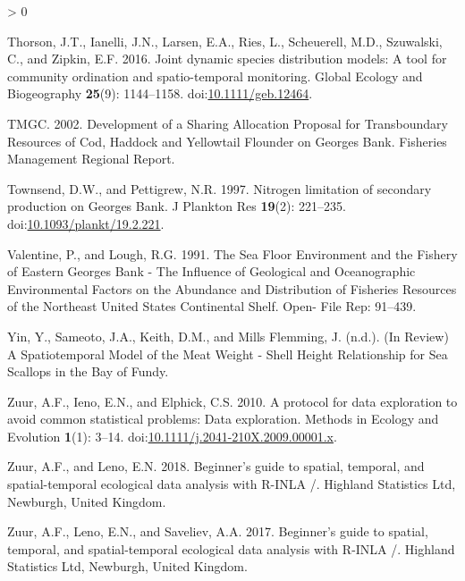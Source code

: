 \documentclass[
]{article}
\newlength{\cslhangindent}
\newenvironment{CSLReferences}[2] %
 {%
  \setlength{\parindent}{0pt}
  \ifodd #1 \everypar{\setlength{\hangindent}{\cslhangindent}}\ignorespaces\fi
  \ifnum #2 > 0
  \setlength{\parskip}{#2\baselineskip}
  \fi
 }%
 {}
\begin{document}
\begin{CSLReferences}{1}{0}
\leavevmode\hypertarget{ref-thorsonJointDynamicSpecies2016}{}%
Thorson, J.T., Ianelli, J.N., Larsen, E.A., Ries, L., Scheuerell, M.D., Szuwalski, C., and Zipkin, E.F. 2016. Joint dynamic species distribution models: A tool for community ordination and spatio-temporal monitoring. Global Ecology and Biogeography \textbf{25}(9): 1144--1158. doi:\href{https://doi.org/10.1111/geb.12464}{10.1111/geb.12464}.

\leavevmode\hypertarget{ref-tmgcDevelopmentSharingAllocation2002}{}%
TMGC. 2002. Development of a {Sharing Allocation Proposal} for {Transboundary Resources} of {Cod}, {Haddock} and {Yellowtail Flounder} on {Georges Bank}. Fisheries Management Regional Report.

\leavevmode\hypertarget{ref-townsendNitrogenLimitationSecondary1997}{}%
Townsend, D.W., and Pettigrew, N.R. 1997. Nitrogen limitation of secondary production on {Georges Bank}. J Plankton Res \textbf{19}(2): 221--235. doi:\href{https://doi.org/10.1093/plankt/19.2.221}{10.1093/plankt/19.2.221}.

\leavevmode\hypertarget{ref-valentineSeaFloorEnvironment1991}{}%
Valentine, P., and Lough, R.G. 1991. The {Sea Floor Environment} and the {Fishery} of {Eastern Georges Bank} - {The Influence} of {Geological} and {Oceanographic Environmental Factors} on the {Abundance} and {Distribution} of {Fisheries Resources} of the {Northeast United States Continental Shelf}. Open- File Rep: 91--439.

\leavevmode\hypertarget{ref-yinPrepSpatiotemporalModel2019}{}%
Yin, Y., Sameoto, J.A., Keith, D.M., and Mills Flemming, J. (n.d.). ({In Review}) {A Spatiotemporal Model} of the {Meat Weight} - {Shell Height Relationship} for {Sea Scallops} in the {Bay} of {Fundy}.

\leavevmode\hypertarget{ref-zuurProtocolDataExploration2010}{}%
Zuur, A.F., Ieno, E.N., and Elphick, C.S. 2010. A protocol for data exploration to avoid common statistical problems: {Data} exploration. Methods in Ecology and Evolution \textbf{1}(1): 3--14. doi:\href{https://doi.org/10.1111/j.2041-210X.2009.00001.x}{10.1111/j.2041-210X.2009.00001.x}.

\leavevmode\hypertarget{ref-zuurBeginnerGuideSpatial2018}{}%
Zuur, A.F., and Leno, E.N. 2018. Beginner's guide to spatial, temporal, and spatial-temporal ecological data analysis with {R}-{INLA} /. {Highland Statistics Ltd}, {Newburgh, United Kingdom}.

\leavevmode\hypertarget{ref-zuurBeginnerGuideSpatial2017}{}%
Zuur, A.F., Leno, E.N., and Saveliev, A.A. 2017. Beginner's guide to spatial, temporal, and spatial-temporal ecological data analysis with {R}-{INLA} /. {Highland Statistics Ltd}, {Newburgh, United Kingdom}.

\end{CSLReferences}
\end{document}
